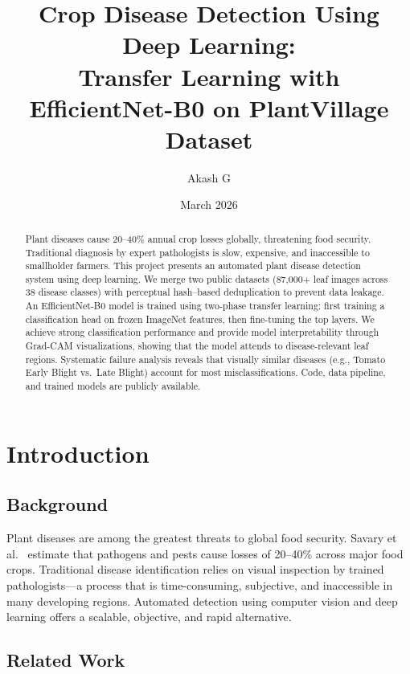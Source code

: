 \documentclass[12pt, a4paper]{article}
\title{\textbf{Crop Disease Detection Using Deep Learning:\\Transfer Learning with EfficientNet-B0 on PlantVillage Dataset}}
\author{Akash G}
\date{March 2026}
\begin{document}
\maketitle

\begin{abstract}
Plant diseases cause 20--40\% annual crop losses globally, threatening food security. Traditional diagnosis by expert pathologists is slow, expensive, and inaccessible to smallholder farmers. This project presents an automated plant disease detection system using deep learning. We merge two public datasets (87,000+ leaf images across 38 disease classes) with perceptual hash--based deduplication to prevent data leakage. An EfficientNet-B0 model is trained using two-phase transfer learning: first training a classification head on frozen ImageNet features, then fine-tuning the top layers. We achieve strong classification performance and provide model interpretability through Grad-CAM visualizations, showing that the model attends to disease-relevant leaf regions. Systematic failure analysis reveals that visually similar diseases (e.g., Tomato Early Blight vs.\ Late Blight) account for most misclassifications. Code, data pipeline, and trained models are publicly available.
\end{abstract}

\tableofcontents
\newpage

\section{Introduction}

\subsection{Background}

Plant diseases are among the greatest threats to global food security. Savary et al.~\cite{savary2019} estimate that pathogens and pests cause losses of 20--40\% across major food crops. Traditional disease identification relies on visual inspection by trained pathologists---a process that is time-consuming, subjective, and inaccessible in many developing regions. Automated detection using computer vision and deep learning offers a scalable, objective, and rapid alternative.

\subsection{Related Work}
\end{document}
